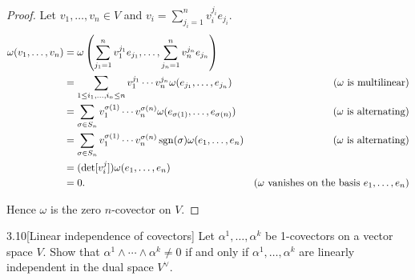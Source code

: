 \begin{proof}
    Let \( v_{1}, \ldots, v_{n} \in V \) and \( v_{i} = \sum^{n}_{j_{i}=1} v_{i}^{j_{i}} e_{j_{i}} \).
    \begingroup
    \allowdisplaybreaks%
    \begin{align*}
        \omega(v_{1}, \ldots, v_{n}) & = \omega\left(\sum^{n}_{j_{1}=1} v_{1}^{j_{1}} e_{j_{1}}, \ldots, \sum^{n}_{j_{n}=1} v_{n}^{j_{n}} e_{j_{n}}\right)                                                                              \\
                                     & = \sum_{1\leq i_{1}, \ldots, i_{n} \leq n} v_{1}^{j_{1}}\cdots v_{n}^{j_{n}}\omega(e_{j_{1}}, \ldots, e_{j_{n}})          & \text{(\(\omega\) is multilinear)}                                   \\
                                     & = \sum_{\sigma\in S_{n}} v_{1}^{\sigma(1)}\cdots v_{n}^{\sigma(n)} \omega(e_{\sigma(1)}, \ldots, e_{\sigma(n)})           & \text{(\(\omega\) is alternating)}                                   \\
                                     & = \sum_{\sigma\in S_{n}} v_{1}^{\sigma(1)}\cdots v_{n}^{\sigma(n)}\operatorname{sgn}(\sigma) \omega(e_{1}, \ldots, e_{n}) & \text{(\(\omega\) is alternating)}                                   \\
                                     & = (\det[v_{i}^{j}])\omega(e_{1}, \ldots, e_{n})                                                                                                                                                  \\
                                     & = 0.                                                                                                                      & \text{(\(\omega\) vanishes on the basis \( e_{1}, \ldots, e_{n} \))}
    \end{align*}
    \endgroup

    Hence \( \omega \) is the zero \( n \)-covector on \( V \).
\end{proof}

\begin{problem}{3.10}[Linear independence of covectors]\label{problem:3.10}
Let \( \alpha^{1}, \ldots, \alpha^{k} \) be 1-covectors on a vector space \( V \). Show that \( \alpha^{1} \land \cdots \land \alpha^{k} \neq 0 \) if and only if \( \alpha^{1}, \ldots, \alpha^{k} \) are linearly independent in the dual space \( V^{\vee} \).
\end{problem}

